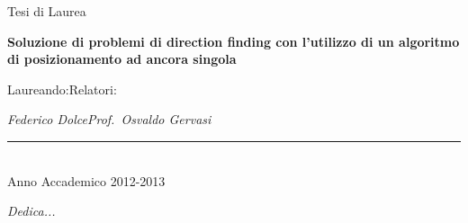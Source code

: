 \documentclass[a4paper,12pt]{report}
\def\titolotesi{Soluzione di problemi di direction finding con l'utilizzo di un algoritmo di posizionamento ad ancora singola} %
\def\laureando{Federico Dolce}       %
\def\annoaccademico{2012-2013}    %
\def\dedica{Dedica...}      %
\newlength\corpo
\begin{document}
\begin{titlepage}
\begin{center}
\vspace*{-2.5cm}

\Large Tesi di Laurea \par\bigskip



{\large \bf \titolotesi \par}

\bigskip\bigskip\bigskip

\end{center}\par

\hspace{0.05cm}Laureando:\hspace{7.3cm}Relatori:\par

\hspace{0.0cm}\emph{\laureando}\hfill\emph{Prof.~Osvaldo Gervasi}\\

\vfill

\begin{center}

\rule{40mm}{0.01mm}\\

Anno Accademico \annoaccademico

\end{center}

\end{titlepage}
\newpage
\vspace*{2.5cm}
\begin{flushright}
\begin{Large}\emph{\dedica}\end{Large}
\end{flushright}
\frenchspacing
%
\tableofcontents
\listoffigures
{}
\pagestyle{fancy}
\fancyfoot[LE,RO]{\thepage \hfil}

\end{document}
